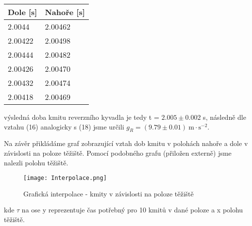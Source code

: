 \documentclass{article}
\begin{document}
\begin{center}
    \label{tab:title}
    \begin{tabular}{ | l |  p{3cm} |} \hline
    Dole [s] & Nahoře [s]  \\ \hline
    2.0044  & 2.00462 \\ \hline
    2.00422 & 2.00498 \\ \hline
    2.00444 & 2.00482 \\ \hline
    2.00426 & 2.00470  \\ \hline
    2.00432 & 2.00474 \\ \hline
    2.00418 & 2.00469 \\ \hline
    \end{tabular}
\end{center}
výsledná doba kmitu reverzního kyvadla je tedy t = $2.005\pm0.002$ s, následně
dle vztahu (16) analogicky s (18) jsme určili $g_{R} = (9.79\pm0.01) \: \mathrm{m \cdot s^{-2}}$.
\par Na závěr přikládáme graf zobrazující vztah dob kmitu v polohách nahoře a dole v závislosti na poloze těžiště. Pomocí podobného grafu (přiložen externě) jsme nalezli polohu těžiště.
\begin{figure}[H]
\centering
\caption{Grafická interpolace - kmity v závislosti na poloze těžiště}
\texttt{[image: Interpolace.png]}
\end{figure}
kde $\tau$ na ose y reprezentuje čas potřebný pro 10 kmitů v dané poloze a x polohu těžiště.
\end{document}
